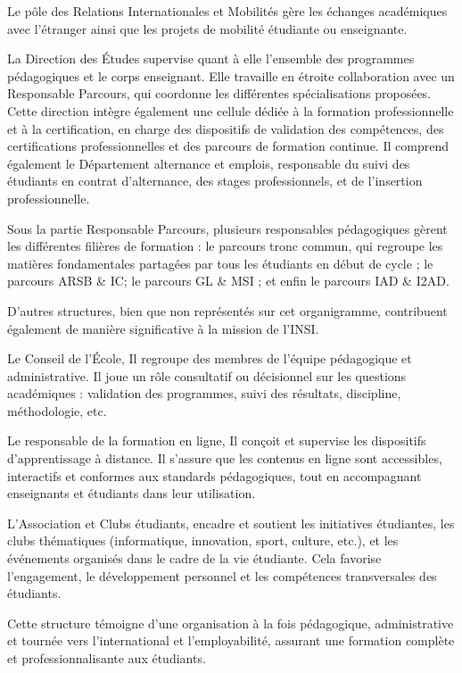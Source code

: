 Le pôle des Relations Internationales et Mobilités gère les
échanges académiques avec l'étranger ainsi que les projets de mobilité
étudiante ou enseignante.

La Direction des Études supervise quant à elle l'ensemble des
programmes pédagogiques et le corps enseignant. Elle travaille en
étroite collaboration avec un Responsable Parcours, qui
coordonne les différentes spécialisations proposées. Cette direction
intègre également une cellule dédiée à la formation
	professionnelle et à la certification, en charge des dispositifs de
validation des compétences, des certifications professionnelles et des
parcours de formation continue. Il comprend également le
Département alternance et emplois, responsable du suivi des
étudiants en contrat d'alternance, des stages professionnels, et de
l'insertion professionnelle.

Sous la partie Responsable Parcours, plusieurs responsables
pédagogiques gèrent les différentes filières de formation : le
parcours tronc commun, qui regroupe les matières fondamentales
partagées par tous les étudiants en début de cycle ; le parcours
	ARSB \& IC; le parcours GL \& MSI ; et enfin le
parcours IAD \& I2AD.

D'autres structures, bien que non représentés sur cet organigramme,
contribuent également de manière significative à la mission de l'INSI.

Le Conseil de l'École, Il regroupe des membres de l'équipe
pédagogique et administrative. Il joue un rôle consultatif ou
décisionnel sur les questions académiques : validation des programmes,
suivi des résultats, discipline, méthodologie, etc.

Le responsable de la formation en ligne, Il conçoit et
supervise les dispositifs d'apprentissage à distance. Il s'assure que
les contenus en ligne sont accessibles, interactifs et conformes aux
standards pédagogiques, tout en accompagnant enseignants et étudiants
dans leur utilisation.

L'Association et Clubs étudiants, encadre et soutient les
initiatives étudiantes, les clubs thématiques (informatique, innovation,
sport, culture, etc.), et les événements organisés dans le cadre de la
vie étudiante. Cela favorise l'engagement, le développement personnel et
les compétences transversales des étudiants.

Cette structure témoigne d'une organisation à la fois pédagogique,
administrative et tournée vers l'international et l'employabilité,
assurant une formation complète et professionnalisante aux étudiants.

